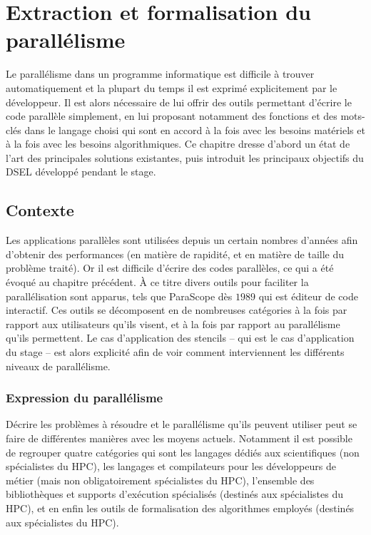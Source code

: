 
\chapter{Extraction et formalisation du parallélisme}

Le parallélisme dans un programme informatique est difficile à trouver automatiquement et la plupart du temps il est exprimé explicitement par le développeur. Il est alors nécessaire de lui offrir des outils permettant d'écrire le code parallèle simplement, en lui proposant notamment des fonctions et des mots-clés dans le langage choisi qui sont en accord à la fois avec les besoins matériels et à la fois avec les besoins algorithmiques. Ce chapitre dresse d'abord un état de l'art des principales solutions existantes, puis introduit les principaux objectifs du DSEL développé pendant le stage.

\section{Contexte}

Les applications parallèles sont utilisées depuis un certain nombres d'années afin d'obtenir des performances (en matière de rapidité, et en matière de taille du problème traité). Or il est difficile d'écrire des codes parallèles, ce qui a été évoqué au chapitre précédent. À ce titre divers outils pour faciliter la parallélisation sont apparus, tels que \textsf{ParaScope} dès $1989$ \cite{Art24} qui est éditeur de code interactif. Ces outils se décomposent en de nombreuses catégories à la fois par rapport aux utilisateurs qu'ils visent, et à la fois par rapport au parallélisme qu'ils permettent. Le cas d'application des stencils -- qui est le cas d'application du stage -- est alors explicité afin de voir comment interviennent les différents niveaux de parallélisme. 

\subsection{Expression du parallélisme}

Décrire les problèmes à résoudre et le parallélisme qu'ils peuvent utiliser peut se faire de différentes manières avec les moyens actuels. Notamment il est possible de regrouper quatre catégories qui sont les langages dédiés aux scientifiques (non spécialistes du HPC), les langages et compilateurs pour les développeurs de métier (mais non obligatoirement spécialistes du HPC), l'ensemble des bibliothèques et supports d'exécution spécialisés (destinés aux spécialistes du HPC), et en enfin les outils de formalisation des algorithmes employés (destinés aux spécialistes du HPC).

